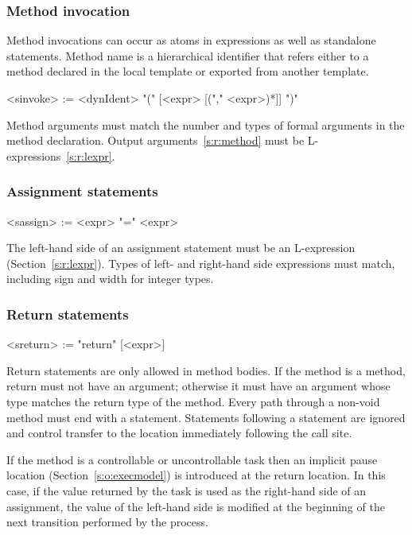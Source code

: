 \subsubsection{Method invocation}\label{s:r:invocation}

Method invocations can occur as atoms in expressions as well as 
standalone statements.  Method name is a hierarchical identifier 
that refers either to a method declared in the local template or 
exported from another template.
\begin{bnflisting}
<sinvoke> := <dynIdent> "(" [<expr> [("," <expr>)*]] ")"
\end{bnflisting}
Method arguments must match the number and types of formal 
arguments in the method declaration.  Output 
arguments~\ref{s:r:method} must be L-expressions~\ref{s:r:lexpr}.

\subsubsection{Assignment statements}

\begin{bnflisting}
<sassign> := <expr> "=" <expr>
\end{bnflisting}

The left-hand side of an assignment statement must be an 
L-expression (Section~\ref{s:r:lexpr}).  Types of left- 
and right-hand side expressions must match, including sign 
and width for integer types.

\subsubsection{Return statements}\label{s:r:return}

\begin{bnflisting}
<sreturn> := "return" [<expr>]
\end{bnflisting}

Return statements are only allowed in method bodies.  If the 
method is a  method, return must not have an argument; 
otherwise it must have an argument whose type matches the return 
type of the method.  Every path through a non-void method must end 
with a  statement.  Statements following a 
 statement are ignored and control transfer to the 
location immediately following the call site.  

If the method is a controllable or uncontrollable task then an 
implicit pause location (Section~\ref{s:o:execmodel}) is 
introduced at the return location.  In this case, if the value 
returned by the task is used as the right-hand side of an 
assignment, the value of the left-hand side is modified at the 
beginning of the next transition performed by the process.

